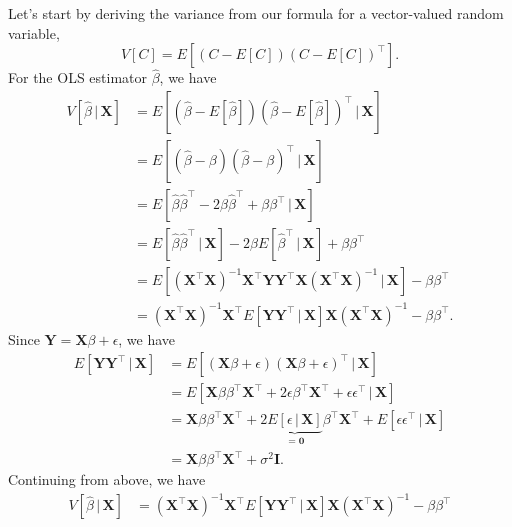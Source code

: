 \documentclass[12pt,oneside,openany]{book}
\begin{document}
Let's start by deriving the variance from our formula for a
vector-valued random variable, \[
V[C] = E \left[ (C - E[C]) (C - E[C])^\top \right].
\] For the OLS estimator \(\hat{\beta}\), we have \[
\begin{aligned}
  V[\hat{\beta} \,|\, \mathbf{X}]
  &= E \left[ \left(\hat{\beta} - E[\hat{\beta}]\right) \left(\hat{\beta} - E[\hat{\beta}]\right)^\top \,|\, \mathbf{X} \right] \\
  &= E \left[ \left(\hat{\beta} - \beta\right) \left(\hat{\beta} - \beta\right)^\top \,|\, \mathbf{X} \right] \\
  &= E \left[ \hat{\beta} \hat{\beta}^\top - 2 \beta \hat{\beta}^\top + \beta \beta^\top \,|\, \mathbf{X} \right] \\
  &= E \left[ \hat{\beta} \hat{\beta}^\top \,|\, \mathbf{X} \right] - 2 \beta E \left[ \hat{\beta}^\top \,|\, \mathbf{X} \right] + \beta \beta^\top \\
  &= E \left[ (\mathbf{X}^\top \mathbf{X})^{-1} \mathbf{X}^\top \mathbf{Y} \mathbf{Y}^\top \mathbf{X} (\mathbf{X}^\top \mathbf{X})^{-1} \,|\, \mathbf{X} \right] - \beta \beta^\top \\
  &= (\mathbf{X}^\top \mathbf{X})^{-1} \mathbf{X}^\top E \left[ \mathbf{Y} \mathbf{Y}^\top \,|\, \mathbf{X} \right] \mathbf{X} (\mathbf{X}^\top \mathbf{X})^{-1} - \beta \beta^\top.
\end{aligned}
\] Since \(\mathbf{Y} = \mathbf{X} \beta + \epsilon\), we have \[
\begin{aligned}
  E \left[ \mathbf{Y} \mathbf{Y}^\top \,|\, \mathbf{X} \right]
  &= E \left[ (\mathbf{X} \beta + \epsilon) (\mathbf{X} \beta + \epsilon)^\top \,|\, \mathbf{X} \right] \\
  &= E \left[ \mathbf{X} \beta \beta^\top \mathbf{X}^\top + 2 \epsilon \beta^\top \mathbf{X}^\top + \epsilon \epsilon^\top \,|\, \mathbf{X} \right] \\
  &= \mathbf{X} \beta \beta^\top \mathbf{X}^\top + 2 \underbrace{E[\epsilon \,|\, \mathbf{X}]}_{= \mathbf{0}} \beta^\top \mathbf{X}^\top + E[\epsilon \epsilon^\top \,|\, \mathbf{X}] \\
  &= \mathbf{X} \beta \beta^\top \mathbf{X}^\top + \sigma^2 \mathbf{I}.
\end{aligned}
\] Continuing from above, we have \[
\begin{aligned}
  V[\hat{\beta} \,|\, \mathbf{X}]
  &= (\mathbf{X}^\top \mathbf{X})^{-1} \mathbf{X}^\top E \left[ \mathbf{Y} \mathbf{Y}^\top \,|\, \mathbf{X} \right] \mathbf{X} (\mathbf{X}^\top \mathbf{X})^{-1} - \beta \beta^\top \\

\end{aligned}\]
\end{document}
